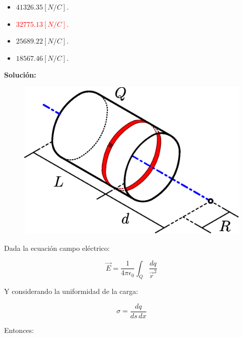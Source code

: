 \documentclass[letter,11pt]{article}
\begin{document}
\begin{enumerate}
\begin{itemize}
    \item $41326.35 [N/C]$.
    \item \textcolor{red}{$32775.13 [N/C]$.}
    \item $25689.22 [N/C]$.
    \item $18567.46 [N/C]$.
\end{itemize}

\textbf{Solución:} \\

\begin{figure}[!h]
\centering
\includegraphics[scale=0.40]{resources/a2.eps}
\end{figure}

Dada la ecuación campo eléctrico:

\begin{equation*}
    \vec{E} = \frac{1}{4\pi\epsilon_0}\int_{Q}\frac{dq}{\vec{r}^2}
\end{equation*}

Y considerando la uniformidad de la carga:

\begin{equation*}
    \sigma = \frac{dq}{ds\,dx}
\end{equation*}

Entonces:


\end{enumerate}
\end{document}
